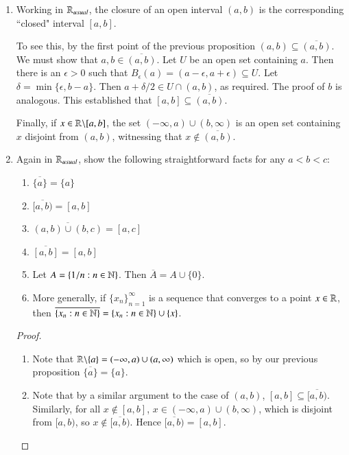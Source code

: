 \documentclass[12pt, a4paper, oneside, openright, titlepage]{book}
\begin{document}
\begin{eg}
    \leavevmode
    \begin{enumerate}
        \item Working in $\mathbb R_{usual}$, the closure of an open interval $(a,b)$ is the corresponding ``closed" interval $[a,b]$.

            To see this, by the first point of the previous proposition $(a,b) \subseteq \overline{(a,b)}$. We must show that $a,b \in \overline{(a,b)}$. Let $U$ be an open set containing $a$. Then there is an $\epsilon > 0$ such that $B_{\epsilon}(a) = (a-\epsilon,a+\epsilon) \subseteq U$. Let $\delta = \min\{\epsilon,b-a\}$. Then $a+\delta/2 \in U\cap (a,b)$, as required. The proof of $b$ is analogous. This established that $[a,b] \subseteq \overline{(a,b)}$.

            Finally, if $x \in \mathbb R\backslash[a,b]$, the set $(-\infty,a)\cup(b,\infty)$ is an open set containing $x$ disjoint from $(a,b)$, witnessing that $x \notin \overline{(a,b)}$.
        \item Again in $\mathbb R_{usual}$, show the following straightforward facts for any $a<b<c$:\begin{enumerate}
                \item $\overline{\{a\}} = \{a\}$
                \item $\overline{[a,b)} = [a,b]$
                \item $\overline{(a,b)\cup(b,c)} = [a,c]$
                \item $\overline{[a,b]} = [a,b]$
                \item Let $A = \{1/n:n \in \mathbb N\}$. Then $\overline{A} = A\cup\{0\}$.
                \item More generally, if $\{x_n\}_{n=1}^{\infty}$ is a sequence that converges to a point $x \in \mathbb R$, then $\overline{\{x_n:n \in \mathbb N\}} = \{x_n:n\in\mathbb N\}\cup\{x\}$.
        \end{enumerate}
            \begin{proof}
                \leavevmode
                \begin{enumerate}
                    \item Note that $\mathbb R\backslash \{a\} = (-\infty,a)\cup(a,\infty)$ which is open, so by our previous proposition $\overline{\{a\}} = \{a\}$.
                    \item Note that by a similar argument to the case of $(a,b)$, $[a,b] \subseteq \overline{[a,b)}$. Similarly, for all $x \notin [a,b]$, $x \in (-\infty,a)\cup(b,\infty)$, which is disjoint from $[a,b)$, so $x \notin \overline{[a,b)}$. Hence $\overline{[a,b)} = [a,b]$.

\end{enumerate}
\end{proof}
\end{enumerate}
\end{eg}
\end{document}
